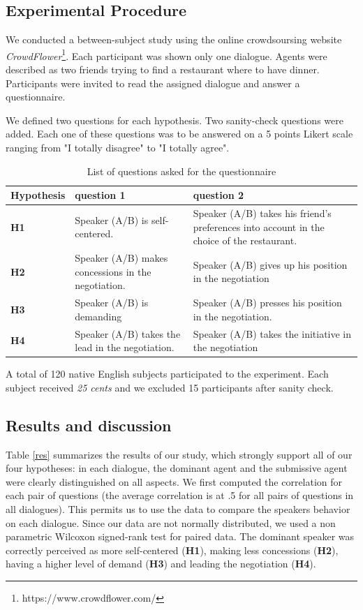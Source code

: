 \documentclass{llncs}
\begin{document}
	
	
	
	\subsection{Experimental Procedure}
	
	We conducted a between-subject study using the online crowdsoursing website \emph{CrowdFlower}\footnote{https://www.crowdflower.com/}. 
	Each participant was shown only one dialogue. Agents were described as two friends trying to find a restaurant where to have dinner. %
	Participants were invited to read the assigned dialogue and answer a questionnaire. 
	
	We defined  two questions for each hypothesis. Two sanity-check questions were added. Each one of these questions was to be answered on a 5 points Likert scale ranging from "I totally disagree" to "I totally agree".
	
	\begin{table}
		\begin{tabular}{|p{1.75cm}|p{5cm}|p{5.5cm}|}
			\hline
			Hypothesis &question 1& question 2 \\
			\hline
			\textbf{H1} &Speaker (A/B) is self-centered. &Speaker (A/B) takes his friend's preferences into account in the choice of the restaurant.\\
			\hline
			\textbf{H2} &Speaker (A/B) makes concessions in the negotiation.&Speaker (A/B) gives up his position in the negotiation\\
			\hline
			\textbf{H3} & Speaker (A/B) is demanding&Speaker (A/B) presses his position in the negotiation. \\
			\hline
			\textbf{H4} &Speaker (A/B) takes the lead in the negotiation.&Speaker (A/B) takes the initiative in the negotiation \\
			\hline
		\end{tabular}
		\caption{List of questions asked for the questionnaire}
		\label{table:questionnaire}
	\end{table}
	A total of 120 native English subjects participated to the experiment. Each subject received \textit{25 cents} and we excluded 15 participants after sanity check.
	
	\subsection{Results and discussion}
	Table  \ref{res} summarizes the results of our study, which strongly support all of our four hypotheses: in each dialogue, the dominant agent and the submissive agent were clearly distinguished on all aspects. We first computed the correlation for each pair of questions (the average correlation is at .5 for all pairs of questions in all dialogues). This permits us to use the data to compare the speakers behavior on each dialogue. Since our data are not normally distributed, we used a non parametric Wilcoxon signed-rank test for paired data. The dominant speaker was correctly perceived as more self-centered (\textbf{H1}), making less concessions (\textbf{H2}), having a higher level of demand (\textbf{H3}) and leading the negotiation (\textbf{H4}).
	
\end{document}
